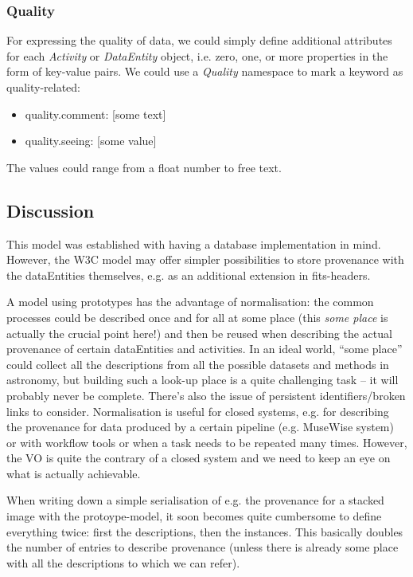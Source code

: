 \documentclass[11pt,a4paper]{ivoa}
\begin{document}
\subsubsection{Quality}
For expressing the quality of data, we could simply define additional 
attributes for each \emph{Activity}
or \emph{DataEntity} object, i.e. zero, one, or more properties in the form of
key-value pairs. We could use a \emph{Quality} namespace to mark a keyword
as quality-related:
\begin{itemize}
    \item quality.comment: [some text]
    \item quality.seeing: [some value]
\end{itemize}
The values could range from a float number to free text.



\subsection{Discussion}
This model was established with having a database implementation in mind. However, the W3C model may offer simpler possibilities to store provenance with the dataEntities themselves, e.g. as an additional extension in fits-headers.

A model using prototypes has the advantage of normalisation: the common processes could be described once and for all at some place (this \emph{some place} is actually the crucial point here!) and then be reused when describing the actual provenance of certain dataEntities and activities.
In an ideal world, ``some place'' could collect all the descriptions from all 
the possible datasets and methods in astronomy, but building such a look-up place is a quite challenging task -- it will probably never be complete. There's also the issue of persistent identifiers/broken links to consider.
Normalisation is useful for closed systems, e.g. for describing the provenance for data produced by a certain pipeline (e.g. MuseWise system) or with workflow tools or when a task needs to be repeated many times. However, the VO is quite the contrary of a closed system and we need to keep an eye on what is actually achievable.

When writing down a simple serialisation of e.g. the provenance for a stacked image with the protoype-model, it soon becomes quite cumbersome to define everything twice: first the descriptions, then the instances. This basically doubles the number of entries to describe provenance (unless there is already some place with all the descriptions to which we can refer).
\end{document}
